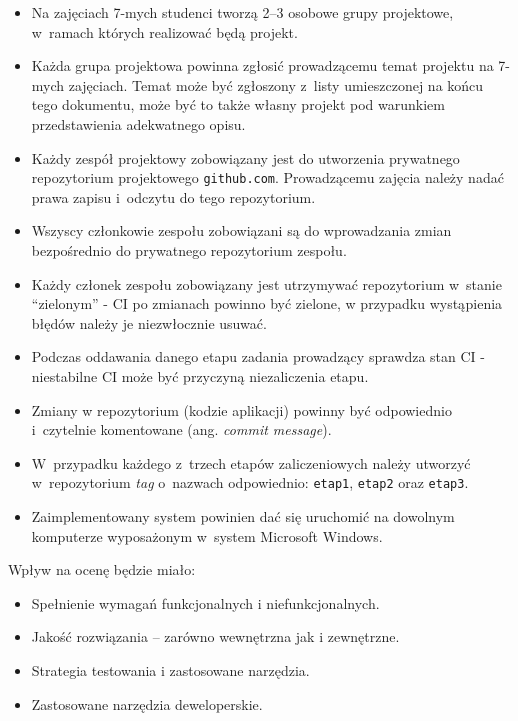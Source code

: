 \documentclass[12pt]{article}
\begin{document}
\begin{itemize}
                \begin{itemize}
                    \item Na zajęciach 7-mych studenci tworzą 2--3 osobowe grupy projektowe, w~ramach których realizować będą projekt.
                    \item Każda grupa projektowa powinna zgłosić prowadzącemu temat projektu na 7-mych zajęciach. Temat może być zgłoszony z~listy umieszczonej na końcu tego dokumentu, może być to także własny projekt pod warunkiem przedstawienia adekwatnego opisu.
                    \item Każdy zespół projektowy zobowiązany jest do utworzenia prywatnego repozytorium projektowego \texttt{github.com}. Prowadzącemu zajęcia należy nadać prawa zapisu i~odczytu do tego repozytorium.
                    \item Wszyscy członkowie zespołu zobowiązani są do wprowadzania zmian bezpośrednio do prywatnego repozytorium zespołu.
                    \item Każdy członek zespołu zobowiązany jest utrzymywać repozytorium w~stanie “zielonym” - CI po zmianach powinno być zielone, w przypadku wystąpienia błędów należy je niezwłocznie usuwać.
                    \item Podczas oddawania danego etapu zadania prowadzący sprawdza stan CI - niestabilne CI może być przyczyną niezaliczenia etapu.
                    \item Zmiany w repozytorium (kodzie aplikacji) powinny być odpowiednio i~czytelnie komentowane (ang. \textit{commit message}).
                    \item W~przypadku każdego z~trzech etapów zaliczeniowych należy utworzyć w~repozytorium \textit{tag} o~nazwach odpowiednio: \texttt{etap1}, \texttt{etap2} oraz \texttt{etap3}.
                    \item Zaimplementowany system powinien dać się uruchomić na dowolnym komputerze wyposażonym w~system Microsoft Windows.
                \end{itemize}
        \end{itemize}

    \noindent Wpływ na ocenę będzie miało:
    \begin{itemize}
        \item Spełnienie wymagań funkcjonalnych i niefunkcjonalnych.
        \item Jakość rozwiązania – zarówno wewnętrzna jak i zewnętrzne.
        \item Strategia testowania i zastosowane narzędzia.
        \item Zastosowane  narzędzia deweloperskie.
    \end{itemize}
\end{document}
